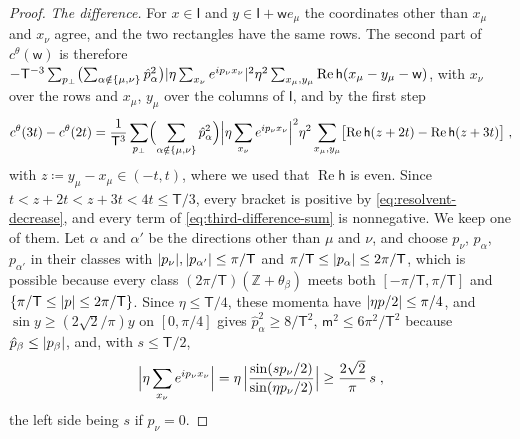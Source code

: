 \documentclass[11pt]{preprint}
\DeclarePairedDelimiter{\abs}{\lvert}{\rvert}
\numberwithin{equation}{section}
\theoremstyle{definition}
\theoremstyle{remark}
\theoremstyle{plain}
\begin{document}
\begin{proof}
\emph{The difference.} For $x \in \mathsf I$ and $y \in \mathsf I + \mathsf we_\mu$ the coordinates other than $x_\mu$ and $x_\nu$ agree, and the two rectangles have the same rows. The second part of $c^\theta(\mathsf w)$ is therefore $-\mathsf T^{-3}\sum_{p_\perp}\bigl(\sum_{\alpha \notin \{ \mu, \nu \}}\hat p_\alpha^2\bigr)\abs{\eta\sum_{x_\nu}e^{ip_\nu x_\nu}}^2\eta^2\sum_{x_\mu,y_\mu}\operatorname{Re}\mathsf h(x_\mu - y_\mu - \mathsf w)$, with $x_\nu$ over the rows and $x_\mu$, $y_\mu$ over the columns of $\mathsf I$, and by the first step
\begin{equation}\label{eq:third-difference-sum}
    c^\theta(3t) - c^\theta(2t) = \frac{1}{\mathsf T^3}\sum_{p_\perp}\Bigl(\sum_{\alpha \notin \{ \mu, \nu \}}\hat p_\alpha^2\Bigr)\Bigl\lvert\eta\sum_{x_\nu}e^{ip_\nu x_\nu}\Bigr\rvert^2\eta^2\sum_{x_\mu,y_\mu}\bigl[\operatorname{Re}\mathsf h(z + 2t) - \operatorname{Re}\mathsf h(z + 3t)\bigr]\;,
\end{equation}
with $z \coloneqq y_\mu - x_\mu \in (-t, t)$, where we used that $\operatorname{Re}\mathsf h$ is even. Since $t < z + 2t < z + 3t < 4t \leq \mathsf T/3$, every bracket is positive by \eqref{eq:resolvent-decrease}, and every term of \eqref{eq:third-difference-sum} is nonnegative. We keep one of them. Let $\alpha$ and $\alpha'$ be the directions other than $\mu$ and $\nu$, and choose $p_\nu$, $p_\alpha$, $p_{\alpha'}$ in their classes with $\abs{p_\nu}, \abs{p_{\alpha'}} \leq \pi/\mathsf T$ and $\pi/\mathsf T \leq \abs{p_\alpha} \leq 2\pi/\mathsf T$, which is possible because every class $(2\pi/\mathsf T)(\mathbb Z + \theta_\beta)$ meets both $[-\pi/\mathsf T, \pi/\mathsf T]$ and $\{ \pi/\mathsf T \leq \abs{p} \leq 2\pi/\mathsf T \}$. Since $\eta \leq \mathsf T/4$, these momenta have $\abs{\eta p/2} \leq \pi/4$, and $\sin y \geq (2\sqrt2/\pi)y$ on $[0, \pi/4]$ gives $\hat p_\alpha^2 \geq 8/\mathsf T^2$, $\mathsf m^2 \leq 6\pi^2/\mathsf T^2$ because $\hat p_\beta \leq \abs{p_\beta}$, and, with $s \leq \mathsf T/2$,
\begin{equation}\label{eq:row-sum}
    \Bigl\lvert\eta\sum_{x_\nu}e^{ip_\nu x_\nu}\Bigr\rvert = \eta\,\Bigl\lvert\frac{\sin(sp_\nu/2)}{\sin(\eta p_\nu/2)}\Bigr\rvert \geq \frac{2\sqrt2}{\pi}\,s\;,
\end{equation}
the left side being $s$ if $p_\nu = 0$.


\end{proof}
\end{document}
